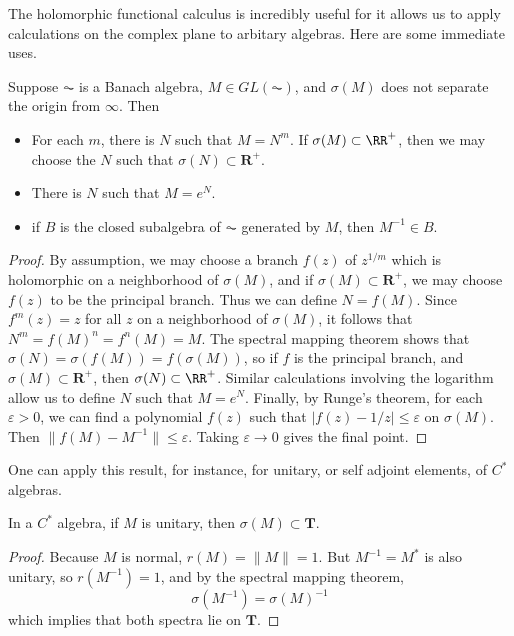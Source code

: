The holomorphic functional calculus is incredibly useful for it allows us to apply calculations on the complex plane to arbitary algebras. Here are some immediate uses.

\begin{theorem}
    Suppose $\AC$ is a Banach algebra, $M \in GL(\AC)$, and $\sigma(M)$ does not separate the origin from $\infty$. Then
    \begin{itemize}
        \item For each $m$, there is $N$ such that $M = N^m$. If $\sigma(M) \subset \RR^+$, then we may choose the $N$ such that $\sigma(N) \subset \mathbf{R}^+$.
        \item There is $N$ such that $M = e^N$.
        \item if $B$ is the closed subalgebra of $\AC$ generated by $M$, then $M^{-1} \in B$.
    \end{itemize}
\end{theorem}
\begin{proof}
    By assumption, we may choose a branch $f(z)$ of $z^{1/m}$ which is holomorphic on a neighborhood of $\sigma(M)$, and if $\sigma(M) \subset \mathbf{R}^+$, we may choose $f(z)$ to be the principal branch. Thus we can define $N = f(M)$. Since $f^m(z) = z$ for all $z$ on a neighborhood of $\sigma(M)$, it follows that $N^m = f(M)^n = f^n(M) = M$. The spectral mapping theorem shows that $\sigma(N) = \sigma(f(M)) = f(\sigma(M))$, so if $f$ is the principal branch, and $\sigma(M) \subset \mathbf{R}^+$, then $\sigma(N) \subset \RR^+$. Similar calculations involving the logarithm allow us to define $N$ such that $M = e^N$. Finally, by Runge's theorem, for each $\varepsilon > 0$, we can find a polynomial $f(z)$ such that $|f(z) - 1/z| \leq \varepsilon$ on $\sigma(M)$. Then $\| f(M) - M^{-1} \| \leq \varepsilon$. Taking $\varepsilon \to 0$ gives the final point.
\end{proof}

One can apply this result, for instance, for unitary, or self adjoint elements, of $C^*$ algebras.

\begin{prop}
    In a $C^*$ algebra, if $M$ is unitary, then $\sigma(M) \subset \mathbf{T}$.
\end{prop}
\begin{proof}
    Because $M$ is normal, $r(M) = \| M \| = 1$. But $M^{-1} = M^*$ is also unitary, so $r(M^{-1}) = 1$, and by the spectral mapping theorem,
    \[ \sigma(M^{-1}) = \sigma(M)^{-1} \]
    which implies that both spectra lie on $\mathbf{T}$.
\end{proof}

